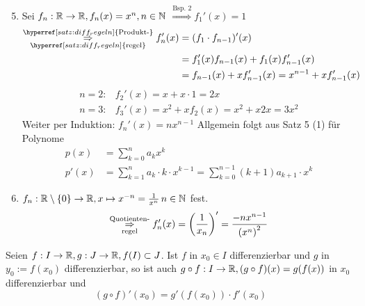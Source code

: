 \documentclass[../ana1.tex]{subfiles}
\begin{document}
\begin{bsp}\leavevmode
    \begin{enumerate}
        \setcounter{enumi}{4}
        \item Sei \( f_n : \mathbb{R} \rightarrow \mathbb{R}, f_n(x) = x^n, n\in\mathbb{N} \)
        \( \overset{\text{Bsp.\ 2}}{\Rightarrow} f_1'(x) = 1 \)
        \begin{align*}
            \overunderset{\hyperref[satz:diff_regeln]{\text{Produkt-}}}{
                \hyperref[satz:diff_regeln]{\text{regel}}}{\Rightarrow} 
            f_n'(x) &= (f_1 \cdot f_{n-1})'(x) \\
            &= f_1'(x) f_{n-1}(x) + f_1(x) f_{n-1}'(x)\\
            &= f_{n-1}(x) + x f_{n-1}'(x) = x^{n-1} + x f_{n-1}'(x)
        \end{align*}
        \begin{align*}
            n=2: & f_2'(x) = x + x \cdot 1 = 2x\\
            n=3: & f_3'(x) = x^2 + x f_2(x) = x^2 + x 2x = 3x^2
        \end{align*}
        Weiter per Induktion: \( f_n'(x) = n x^{n-1} \)
        Allgemein folgt aus Satz 5 (1) für Polynome
        \begin{align*}
            p(x) &= \sum_{k=0}^n a_k x^k \\
            p'(x) &= \sum_{k=1}^n a_k \cdot k \cdot x^{k-1} 
            = \sum_{k=0}^{n-1} (k + 1)a_{k+1} \cdot x^k
        \end{align*}
        \item
        \( f_n: \mathbb{R} \setminus \{0\} \rightarrow \mathbb{R}, 
        x \mapsto x^{-n} = \frac{1}{x^n} \, n\in\mathbb{N} \) fest.
        \[ \overset{\text{Quotienten-}}{\underset{\text{regel}}{\Rightarrow}} 
        f_n'(x) = \left( \frac{1}{x_n} \right)' 
        = \frac{-n x^{n-1}}{{(x^n)}^2} \]
    \end{enumerate}
\end{bsp}
\begin{satz}[Kettenregel]
    Seien \( f: I \rightarrow \mathbb{R}, g : J \rightarrow \mathbb{R}, f(I) \subset J \). 
    Ist \( f \) in \( x_0 \in I \) differenzierbar und \(g\) in 
    \( y_0 := f(x_0) \) differenzierbar, so ist auch 
    \( g \circ f : I \rightarrow \mathbb{R}, (g \circ f)(x) = g(f(x)) \) in \(x_0\) 
    differenzierbar und 
    \[ (g \circ f)'(x_0) = g'(f(x_0)) \cdot f'(x_0) \]
\end{satz}
\end{document}
